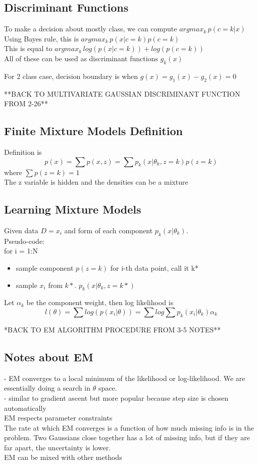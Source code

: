 \documentclass[11pt,psfig]{article}
\begin{document}
\subsection*{Discriminant Functions}

To make a decision about mostly class, we can compute $argmax_k \,p(c=k|x)$\\
Using Bayes rule, this is $argmax_k \, p(x|c=k)p(c=k)$\\
This is equal to $argmax_k \, log(p(x|c=k)) + log(p(c=k))$
\\
All of these can be used as discriminant functions $g_k(x)$

For 2 class case, decision boundary is when $g(x) = g_1(x)-g_2(x) = 0$

**BACK TO MULTIVARIATE GAUSSIAN DISCRIMINANT FUNCTION FROM 2-26**

\subsection*{Finite Mixture Models Definition}
Definition is
\[
p(x) = \sum{p(x,z)} = \sum p_k(x|\theta_k,z=k)p(z=k)
\]
where $\sum{p(z=k)}=1$
\\
The z variable is hidden and the densities can be a mixture

\subsection*{Learning Mixture Models}

Given data $D={x_i}$ and form of each component $p_k(x|\theta_k)$. 
\\
Pseudo-code:
\\
for i = 1:N
\begin{itemize}
\item sample component $p(z=k)$ for i-th data point, call it k*
\item sample $x_i$ from $k*$. $p_k(x|\theta_k,z=k*)$
\end{itemize}

Let $\alpha_k$ be the component weight, then log likelihood is
\[
l(\theta) = \sum{log(p(x_i|\theta))} = \sum{log\sum{p_k(x_i|\theta_k)\alpha_k}}
\]

*BACK TO EM ALGORITHM PROCEDURE FROM 3-5 NOTES**

\subsection*{Notes about EM}

- EM converges to a local minimum of the likelihood or log-likelihood. We are essentially doing a search in $\theta$ space. 
\\
- similar to gradient ascent but more popular because step size is chosen automatically
\\
EM respects parameter constraints
\\
The rate at which EM converges is a function of how much missing info is in the problem. Two Gaussians close together has a lot of missing info, but if they are far apart, the uncertainty is lower.
\\
EM can be mixed with other methods
\end{document}
